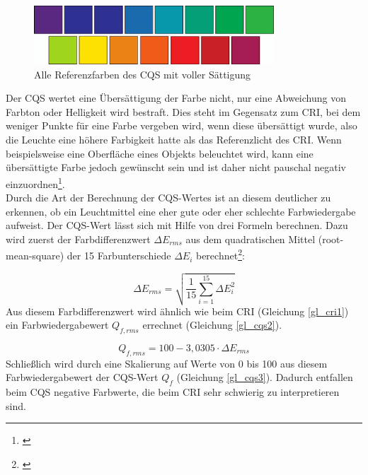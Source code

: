 \begin{figure}[htp]     %
\centering
\includegraphics[width=0.8\textwidth]{bilder/cqs} 
\caption {Alle Referenzfarben des CQS mit voller Sättigung\protect\footnotemark}\label{b_cqs1}
\end{figure}

\noindent Der CQS wertet eine Übersättigung der Farbe nicht, nur eine Abweichung von Farbton oder Helligkeit wird bestraft. Dies steht im Gegensatz zum CRI, bei dem weniger Punkte für eine Farbe vergeben wird, wenn diese übersättigt wurde, also die Leuchte eine höhere Farbigkeit hatte als das Referenzlicht des CRI. Wenn beispielsweise eine Oberfläche eines Objekts beleuchtet wird, kann eine übersättigte Farbe jedoch gewünscht sein und ist daher nicht pauschal negativ einzuordnen\footnote{\cite[3]{davis_ohno}}.\\
Durch die Art der Berechnung der CQS-Wertes ist an diesem deutlicher zu erkennen, ob ein Leuchtmittel eine eher gute oder eher schlechte Farbwiedergabe aufweist. 
Der CQS-Wert lässt sich mit Hilfe von drei Formeln berechnen. Dazu wird zuerst der Farbdifferenzwert $\Delta E_{rms}$ aus dem quadratischen Mittel (root-mean-square) der 15 Farbunterschiede $\Delta E_{i}$ berechnet\footnote{\cite[5]{davis_ohno}}: 

\begin{equation}\label{gl_cqs1}
		\Delta E_{rms} = \sqrt{\frac{1}{15} \sum_{i=1}^{15} \Delta E_{i} ^{2}} 
\end{equation}
Aus diesem Farbdifferenzwert wird ähnlich wie beim CRI (Gleichung \ref{gl_cri1}) ein Farbwiedergabewert $Q_{f,rms}$ errechnet (Gleichung \ref{gl_cqs2}).

\begin{equation}\label{gl_cqs2}
		Q_{f,rms} = 100 - 3,0305 \cdot \Delta E_{rms} 
\end{equation}
Schließlich wird durch eine Skalierung auf Werte von 0 bis 100 aus diesem Farbwiedergabewert der CQS-Wert $Q_{f}$  (Gleichung \ref{gl_cqs3}). Dadurch entfallen beim CQS negative Farbwerte, die beim CRI sehr schwierig zu interpretieren sind. 

